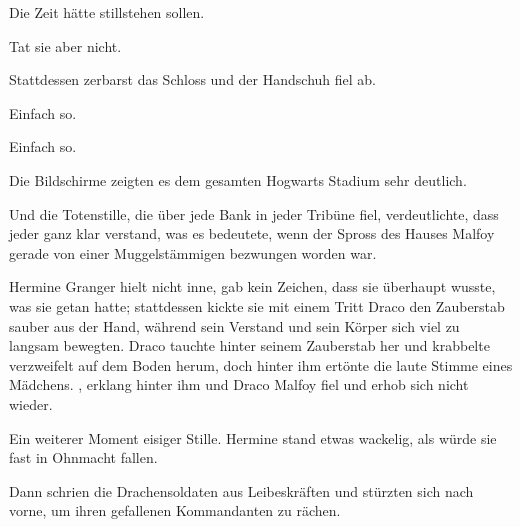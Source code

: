 
Die Zeit hätte stillstehen sollen.

Tat sie aber nicht.

Stattdessen zerbarst das Schloss und der Handschuh fiel ab.

Einfach so.

Einfach so.

Die Bildschirme zeigten es dem gesamten Hogwarts Stadium sehr deutlich.

Und die Totenstille, die über jede Bank in jeder Tribüne fiel, verdeutlichte, dass jeder ganz klar verstand, was es bedeutete, wenn der Spross des Hauses Malfoy gerade von einer Muggelstämmigen bezwungen worden war.

Hermine Granger hielt nicht inne, gab kein Zeichen, dass sie überhaupt wusste, was sie getan hatte; stattdessen kickte sie mit einem Tritt Draco den Zauberstab sauber aus der Hand, während sein Verstand und sein Körper sich viel zu langsam bewegten. Draco tauchte hinter seinem Zauberstab her und krabbelte verzweifelt auf dem Boden herum, doch hinter ihm ertönte die laute Stimme eines Mädchens. , erklang hinter ihm und Draco Malfoy fiel und erhob sich nicht wieder.

Ein weiterer Moment eisiger Stille. Hermine stand etwas wackelig, als würde sie fast in Ohnmacht fallen.

Dann schrien die Drachensoldaten aus Leibeskräften und stürzten sich nach vorne, um ihren gefallenen Kommandanten zu rächen.

